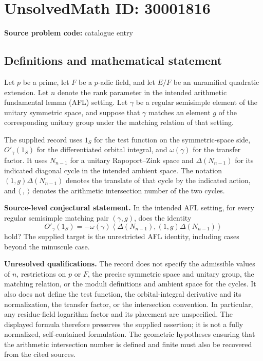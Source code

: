 \documentclass[11pt]{article}
\begin{document}
\section*{UnsolvedMath ID: 30001816}
\textbf{Source problem code:} catalogue entry
\subsection{Definitions and mathematical statement}
Let \(p\) be a prime, let \(F\) be a \(p\)-adic field, and let \(E/F\) be an unramified quadratic extension. Let \(n\) denote the rank parameter in the intended arithmetic fundamental lemma (AFL) setting. Let \(\gamma\) be a regular semisimple element of the unitary symmetric space, and suppose that \(\gamma\) matches an element \(g\) of the corresponding unitary group under the matching relation of that setting.

The supplied record uses \(1_S\) for the test function on the symmetric-space side, \(O'_\gamma(1_S)\) for the differentiated orbital integral, and \(\omega(\gamma)\) for the transfer factor. It uses \(N_{n-1}\) for a unitary Rapoport--Zink space and \(\Delta(N_{n-1})\) for its indicated diagonal cycle in the intended ambient space. The notation \((1,g)\Delta(N_{n-1})\) denotes the translate of that cycle by the indicated action, and \(\langle\ ,\ \rangle\) denotes the arithmetic intersection number of the two cycles.

\textbf{Source-level conjectural statement.} In the intended AFL setting, for every regular semisimple matching pair \((\gamma,g)\), does the identity
\[
O'_\gamma(1_S)
=-\omega(\gamma)
\left\langle
\Delta(N_{n-1}),
(1,g)\Delta(N_{n-1})
\right\rangle
\]
hold? The supplied target is the unrestricted AFL identity, including cases beyond the minuscule case.

\textbf{Unresolved qualifications.} The record does not specify the admissible values of \(n\), restrictions on \(p\) or \(F\), the precise symmetric space and unitary group, the matching relation, or the moduli definitions and ambient space for the cycles. It also does not define the test function, the orbital-integral derivative and its normalization, the transfer factor, or the intersection convention. In particular, any residue-field logarithm factor and its placement are unspecified. The displayed formula therefore preserves the supplied assertion; it is not a fully normalized, self-contained formulation. The geometric hypotheses ensuring that the arithmetic intersection number is defined and finite must also be recovered from the cited sources.
\end{document}
